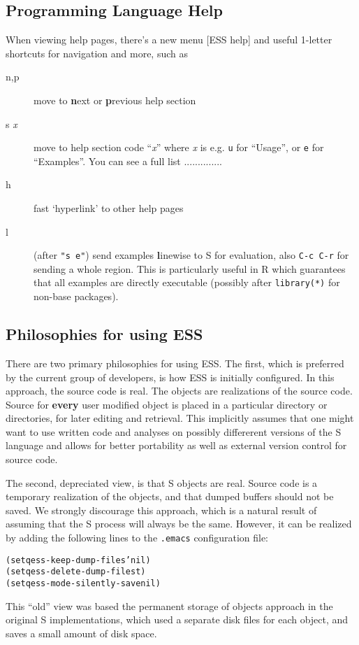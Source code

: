 \documentclass{article}
\newenvironment{Salltt}{\small\begin{alltt}}{\end{alltt}}
\begin{document}
\subsection{Programming Language Help}
\label{sec:S:help}
When viewing help pages, there's a new menu \textsf{[ESS help]} and
useful 1-letter shortcuts for navigation and more, such as
\begin{description}
\item[n,p] move to \textbf{n}ext or \textbf{p}revious help section
\item[s \textit{x}] move to help section code ``\textit{x}'' where
  \textit{x} is e.g. \texttt{u} for ``Usage'', or \texttt{e} for
  ``Examples''.  You can see a full list ..............

\item[h] fast `hyperlink' to other help pages

\item[l] (after \texttt{"s e"}) send examples \textbf{l}inewise to S for
  evaluation, also \texttt{C-c C-r} for sending a whole region.  This 
  is particularly useful in R which guarantees that all examples are
  directly executable (possibly after \texttt{library(*)} for non-base
  packages).
\end{description}

\subsection{Philosophies for using ESS}
\label{sec:S:philosophy}

There are two primary philosophies for using ESS.  The first, which is
preferred by the current group of developers, is how ESS is initially
configured.  In this approach, the source code is real.  The objects
are realizations of the source code.  Source for \textbf{every} user
modified object is placed in a particular directory or directories,
for later editing and retrieval.  This implicitly assumes that one
might want to use written code and analyses on possibly differerent
versions of the S language and allows for better portability as well
as external version control for source code.

The second, depreciated view, is that S objects are real.  Source code
is a temporary realization of the objects, and that dumped buffers
should not be saved.  We strongly discourage this approach, which is a
natural result of assuming that the S process will always be the same.
However, it can be realized by adding the following lines to the
\texttt{.emacs} configuration file:
\begin{Salltt}
  (setq ess-keep-dump-files 'nil)
  (setq ess-delete-dump-files t)
  (setq ess-mode-silently-save nil)
\end{Salltt}
This ``old'' view was based the permanent storage of objects approach
in the original S implementations, which used a separate disk files
for each object, and saves a small amount of disk space.  
\end{document}
